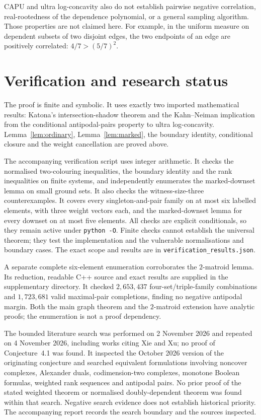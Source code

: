 \documentclass[11pt,a4paper]{article}
\theoremstyle{remark}
\begin{document}
CAPU and ultra log-concavity also do not establish pairwise negative correlation, real-rootedness of the dependence polynomial, or a general sampling algorithm. Those properties are not claimed here. For example, in the uniform measure on dependent subsets of two disjoint edges, the two endpoints of an edge are positively correlated: $4/7>(5/7)^2$.



\section{Verification and research status}

The proof is finite and symbolic. It uses exactly two imported mathematical results: Katona's intersection-shadow theorem and the Kahn--Neiman implication from the conditional antipodal-pairs property to ultra log-concavity. Lemma~\ref{lem:ordinary}, Lemma~\ref{lem:marked}, the boundary identity, conditional closure and the weight cancellation are proved above.

The accompanying verification script uses integer arithmetic. It checks the normalised two-colouring inequalities, the boundary identity and the rank inequalities on finite systems, and independently enumerates the marked-downset lemma on small ground sets. It also checks the witness-size-three counterexamples. It covers every singleton-and-pair family on at most six labelled elements, with three weight vectors each, and the marked-downset lemma for every downset on at most five elements. All checks are explicit conditionals, so they remain active under \texttt{python -O}. Finite checks cannot establish the universal theorem; they test the implementation and the vulnerable normalisations and boundary cases. The exact scope and results are in \texttt{verification\_results.json}.

A separate complete six-element enumeration corroborates the $2$-matroid lemma. Its reduction, readable C++ source and exact results are supplied in the supplementary directory. It checked $2{,}653{,}437$ four-set/triple-family combinations and $1{,}723{,}681$ valid maximal-pair completions, finding no negative antipodal margin. Both the main graph theorem and the $2$-matroid extension have analytic proofs; the enumeration is not a proof dependency.

The bounded literature search was performed on 2 November 2026 and repeated on 4 November 2026, including works citing Xie and Xu; no proof of Conjecture~4.1 was found. It inspected the October 2026 version of the originating conjecture and searched equivalent formulations involving noncover complexes, Alexander duals, codimension-two complexes, monotone Boolean formulas, weighted rank sequences and antipodal pairs. No prior proof of the stated weighted theorem or normalised doubly-dependent theorem was found within that search. Negative search evidence does not establish historical priority. The accompanying report records the search boundary and the sources inspected.
\end{document}
